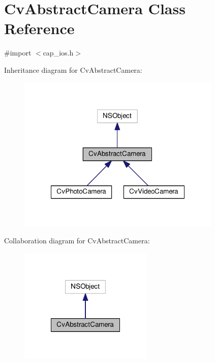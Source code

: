 \hypertarget{interfaceCvAbstractCamera}{\section{Cv\-Abstract\-Camera Class Reference}
\label{interfaceCvAbstractCamera}
}


{\ttfamily \#import $<$cap\-\_\-ios.\-h$>$}



Inheritance diagram for Cv\-Abstract\-Camera\-:\nopagebreak
\begin{figure}[H]
\begin{center}
\leavevmode
\includegraphics[width=275pt]{interfaceCvAbstractCamera__inherit__graph}
\end{center}
\end{figure}


Collaboration diagram for Cv\-Abstract\-Camera\-:\nopagebreak
\begin{figure}[H]
\begin{center}
\leavevmode
\includegraphics[width=180pt]{interfaceCvAbstractCamera__coll__graph}
\end{center}
\end{figure}

